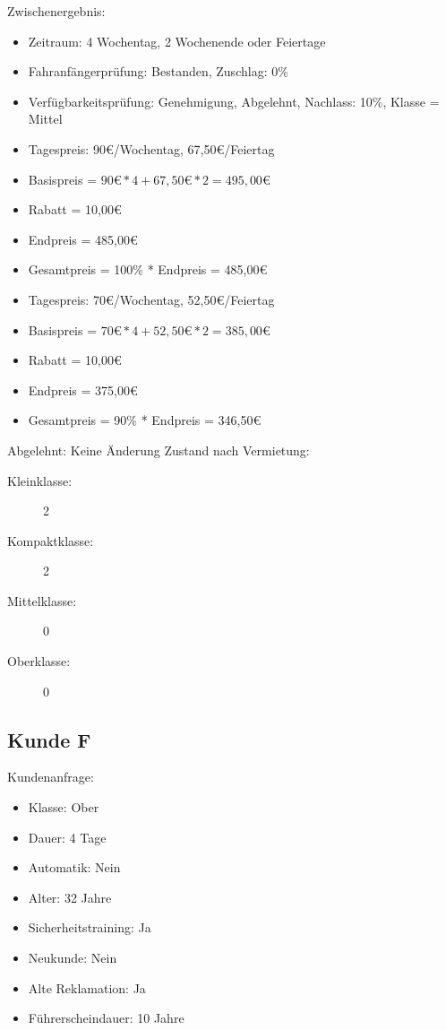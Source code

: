 Zwischenergebnis:
\begin{itemize}
	\item Zeitraum: 4 Wochentag, 2 Wochenende oder Feiertage
	\item Fahranfängerprüfung: Bestanden, Zuschlag: 0\%
	\item Verfügbarkeitsprüfung: Genehmigung, Abgelehnt, Nachlass: 10\%, Klasse = Mittel
	
	\item Tagespreis: 90€/Wochentag, 67,50€/Feiertag
	\item Basispreis = $90€ * 4 + 67,50€ * 2 = 495,00€$
	\item Rabatt = 10,00€
	\item Endpreis = 485,00€
	\item Gesamtpreis = 100\% * Endpreis = 485,00€
	
	\item Tagespreis: 70€/Wochentag, 52,50€/Feiertag
	\item Basispreis = $70€ * 4 + 52,50€ * 2 = 385,00€$
	\item Rabatt = 10,00€
	\item Endpreis = 375,00€
	\item Gesamtpreis = 90\% * Endpreis = 346,50€
\end{itemize}

Abgelehnt: Keine Änderung
Zustand nach Vermietung:
\begin{description}
	\item[Kleinklasse:] 2
	\item[Kompaktklasse:] 2
	\item[Mittelklasse:] 0
	\item[Oberklasse:] 0
\end{description}

\subsection{Kunde F}

Kundenanfrage:
\begin{itemize}
	\item Klasse: Ober
	\item Dauer: 4 Tage
	\item Automatik: Nein
	
	\item Alter: 32 Jahre
	\item Sicherheitstraining: Ja
	\item Neukunde: Nein
	\item Alte Reklamation: Ja
	\item Führerscheindauer: 10 Jahre
\end{itemize}

